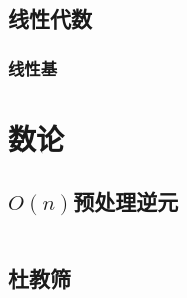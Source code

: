 \documentclass[a4paper]{article}
\begin{document}
\begin{multicols}{2}
			\subsection{线性代数}






				\subsubsection{线性基}








		\section{数论}

			\subsection{$O(n)$预处理逆元}
				\inputminted{cpp}{../src/numbertheory/O(n)求逆元.cpp}

			\subsection{杜教筛}
				\inputminted{cpp}{../src/numbertheory/杜教筛.cpp}
			

\end{multicols}
\end{document}
